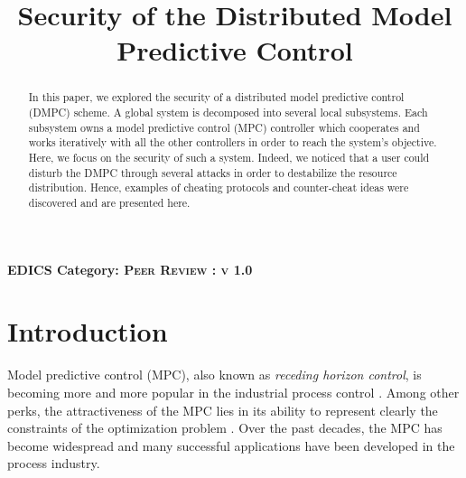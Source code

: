\documentclass[conference]{IEEEtran}
\begin{document}
%
\title{Security of the Distributed Model Predictive Control }


\author{
}

\maketitle
\thispagestyle{plain}
\pagestyle{plain}


\begin{abstract}
In this paper, we explored the security of a distributed model predictive control (DMPC) scheme. A global system is decomposed into several local subsystems. Each subsystem owns a model predictive control (MPC) controller which cooperates and works iteratively with all the other controllers in order to reach the system's objective. Here, we focus on the security of such a system. Indeed, we noticed that a user could disturb the DMPC through several attacks in order to destabilize the resource distribution. Hence, examples of cheating protocols and counter-cheat ideas were discovered and are presented here. 
\end{abstract}

\ifCLASSOPTIONpeerreview
\begin{center} \bfseries EDICS Category: \textsc{ Peer Review  : v 1.0} \end{center}
\fi
%
\IEEEpeerreviewmaketitle



\section{Introduction}
Model predictive control (MPC), also known as \textit{receding horizon control}, is becoming more and more popular in the industrial process control \cite{Venkat, Campo}. Among other perks, the attractiveness of the MPC lies in its ability to represent clearly the constraints of the optimization problem \cite{Jia}. Over the past decades, the MPC has become widespread and many successful applications have been developed in the process industry. 
\end{document}
